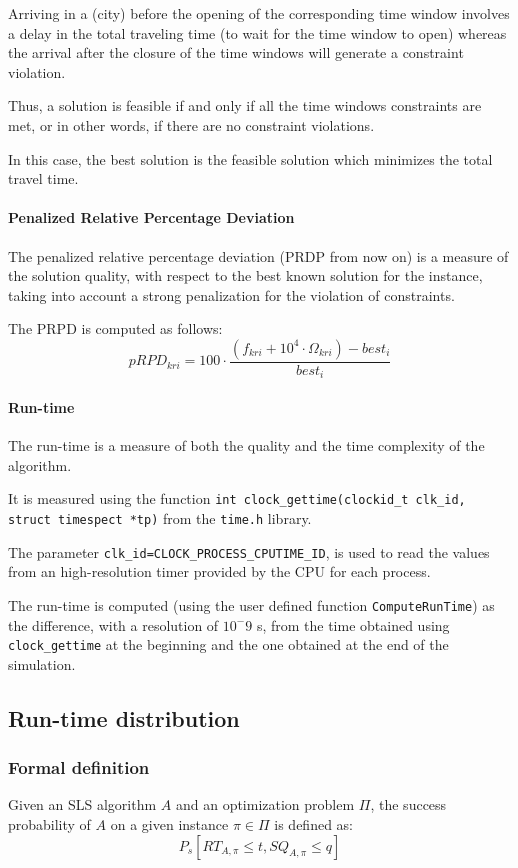 Arriving in a (city) before the opening of the corresponding time window involves a delay in the total traveling time (to wait for the time window to open) whereas the arrival after the closure of the time windows will generate a constraint violation.

Thus, a solution is feasible if and only if all the time windows constraints are met, or in other words, if there are no constraint violations.

In this case, the best solution is the feasible solution which minimizes the total travel time.

\paragraph{Penalized Relative Percentage Deviation}
The penalized relative percentage deviation (PRDP from now on) is a measure of the solution quality, with respect to the best known solution for the instance, taking into account a strong penalization for the violation of constraints.

The PRPD is computed as follows:
\begin{equation}
pRPD_{kri} = 100 \cdot \frac{(f_{kri} + 10^4\cdot\Omega_{kri})-best_i}{best_i}
\end{equation}

\paragraph{Run-time}
The run-time is a measure of both the quality and the time complexity of the algorithm.

It is measured using the function \verb|int clock_gettime(clockid_t clk_id, struct timespect *tp)| from the \verb|time.h| library.

The parameter \verb|clk_id=CLOCK_PROCESS_CPUTIME_ID|, is used to read the values from an high-resolution timer provided by the CPU for each process.

The run-time is computed (using the user defined function \verb|ComputeRunTime|) as the difference, with a resolution of $10^-9$ s, from the time obtained using \verb|clock_gettime| at the beginning and the one obtained at the end of the simulation.


\subsection{Run-time distribution}
\subsubsection{Formal definition}
Given an SLS algorithm $A$ and an optimization problem $\Pi$, the success probability of $A$ on a given instance $\pi \in \Pi$ is defined as: 
\begin{equation}
  P_s[RT_{A,\pi} \le t,SQ_{A,\pi} \le q]
\end{equation}

